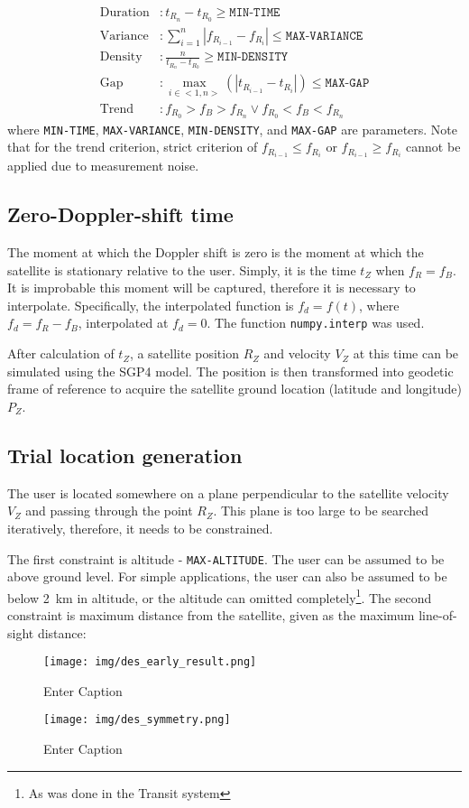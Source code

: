\begin{align*}
    \text{Duration}&: t_{R_n} - t_{R_0} \geq \texttt{MIN-TIME} \\
    \text{Variance}&: \sum^n_{i=1} |f_{R_{i-1}} - f_{R_i}| \leq \texttt{MAX-VARIANCE} \\
    \text{Density}&: \frac{n}{t_{R_n} - t_{R_0}} \geq \texttt{MIN-DENSITY} \\
    \text{Gap}&: \max_{i \in <1, n>}(|t_{R_{i-1}} - t_{R_i}|) \leq \texttt{MAX-GAP} \\
    \text{Trend} &: f_{R_0} > f_B > f_{R_n} \lor f_{R_0} < f_B < f_{R_n}
\end{align*}
where \texttt{MIN-TIME}, \texttt{MAX-VARIANCE}, \texttt{MIN-DENSITY}, and \texttt{MAX-GAP} are parameters. Note that for the trend criterion, strict criterion of $f_{R_{i-1}} \leq f_{R_i}$ or $f_{R_{i-1}} \geq f_{R_i}$ cannot be applied due to measurement noise.


\subsection{Zero-Doppler-shift time}
The moment at which the Doppler shift is zero is the moment at which the satellite is stationary relative to the user. Simply, it is the time $t_Z$ when $f_R = f_B$. It is improbable this moment will be captured, therefore it is necessary to interpolate. Specifically, the interpolated function is $f_d = f(t)$, where $f_d = f_R - f_B$, interpolated at $f_d = 0$. The function \texttt{numpy.interp} was used.

After calculation of $t_Z$, a satellite position $R_Z$ and velocity $V_Z$ at this time can be simulated using the SGP4 model. The position is then transformed into geodetic frame of reference to acquire the satellite ground location (latitude and longitude) $P_Z$.

\subsection{Trial location generation}
The user is located somewhere on a plane perpendicular to the satellite velocity $V_Z$ and passing through the point $R_Z$. This plane is too large to be searched iteratively, therefore, it needs to be constrained.

The first constraint is altitude - \texttt{MAX-ALTITUDE}. The user can be assumed to be above ground level. For simple applications, the user can also be assumed to be below \qty{2}{km} in altitude, or the altitude can omitted completely\footnote{As was done in the Transit system}. The second constraint is maximum distance from the satellite, given as the maximum line-of-sight distance:

\begin{figure}
    \centering
    \texttt{[image: img/des\_early\_result.png]}
    \caption{Enter Caption}
    \label{f_des_early_result}
\end{figure}

\begin{figure}
    \centering
    \texttt{[image: img/des\_symmetry.png]}
    \caption{Enter Caption}
    \label{f_des_symmetry}
\end{figure}
